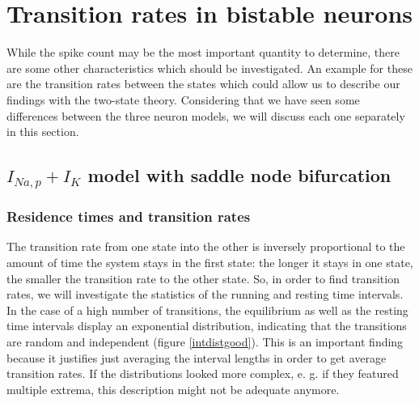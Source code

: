 \documentclass[12pt,a4paper]{article}
\begin{document}
\section{Transition rates in bistable neurons}\label{tranrates}
While the spike count may be the most important quantity to determine, there are some other characteristics which should be investigated. An example for these are the transition rates between the states which could allow us to describe our findings with the two-state theory. Considering that we have seen some differences between the three neuron models, we will discuss each one separately in this section. 
\subsection{$I_{Na,p}+I_K$ model with saddle node bifurcation}
\subsubsection{Residence times and transition rates}
The transition rate from one state into the other is inversely proportional to the amount of time the system stays in the first state: the longer it stays in one state, the smaller the transition rate to the other state. So, in order to find transition rates, we will investigate the statistics of the running and resting time intervals.\\
In the case of a high number of transitions, the equilibrium as well as the resting time intervals display an exponential distribution, indicating that the transitions are random and independent (figure \ref{intdistgood}). This is an important finding because it justifies just averaging the interval lengths in order to get average transition rates. If the distributions looked more complex, e. g. if they featured multiple extrema, this description might not be adequate anymore.
\end{document}
